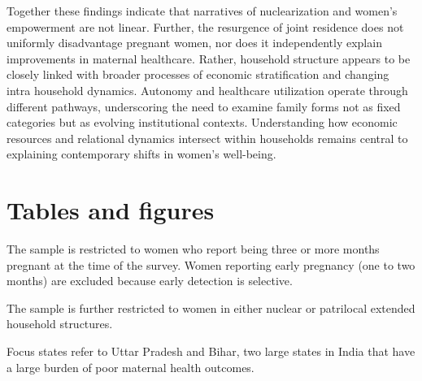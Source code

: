 \documentclass[12pt]{article}
\begin{document}
Together these findings indicate that narratives of nuclearization and women’s empowerment are not linear. Further, the resurgence of joint residence does not uniformly disadvantage pregnant women, nor does it independently explain improvements in maternal healthcare. Rather, household structure appears to be closely linked with broader processes of economic stratification and changing intra household dynamics. Autonomy and healthcare utilization operate through different pathways, underscoring the need to examine family forms not as fixed categories but as evolving institutional contexts. Understanding how economic resources and relational dynamics intersect within households remains central to explaining contemporary shifts in women’s well-being. 

\section{Tables and figures}

\begin{table}[!htbp]
    \centering
    \begin{threeparttable}[t]
        \caption{:  Proportion of pregnant women in patrilocal extended households is increasing among all subgroups}
        \label{tab:proppatrilocal}

        \scriptsize
        \setlength{\tabcolsep}{6pt}
        \renewcommand{\arraystretch}{1.3}

        

        \begin{tablenotes}
            \item The sample is restricted to women who report being three or more months pregnant at the time of the survey. Women reporting early pregnancy (one to two months) are excluded because early detection is selective.
            \item The sample is further restricted to women in either nuclear or patrilocal extended household structures.
            \item Focus states refer to Uttar Pradesh and Bihar, two large states in India that have a large burden of poor maternal health outcomes.
        \end{tablenotes}
    \end{threeparttable}
\end{table}
\end{document}
